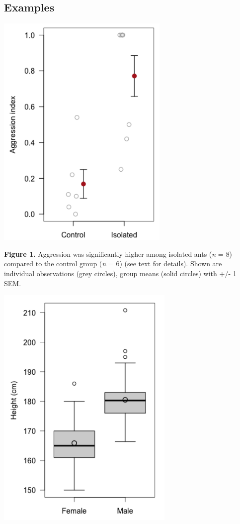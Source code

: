 \documentclass[
]{book}
\begin{document}
\hypertarget{examples}{%
\subsection*{Examples}\label{examples}}

\includegraphics{images/FT_fig-1.png}

\textbf{Figure 1.} Aggression was significantly higher among isolated ants (\emph{n} = 8) compared to the control group (\emph{n} = 6) (see text for details). Shown are individual observations (grey circles), group means (solid circles) with +/- 1 SEM.

\includegraphics{images/FT_fig-2.png}
\end{document}
